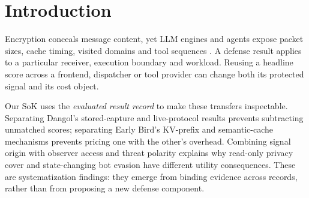\section{Introduction}\label{sec:introduction}
Encryption conceals message content, yet LLM engines and agents expose packet sizes, cache timing, visited domains and tool sequences \cite{weiss2024prompt,promptpeek2025,earlybird2025,agentprint2025,uitraces2026,jeong2026wra}. A defense result applies to a particular receiver, execution boundary and workload. Reusing a headline score across a frontend, dispatcher or tool provider can change both its protected signal and its cost object.

Our SoK uses the \emph{evaluated result record} to make these transfers inspectable. Separating Dangol's stored-capture and live-protocol results prevents subtracting unmatched scores; separating Early Bird's KV-prefix and semantic-cache mechanisms prevents pricing one with the other's overhead. Combining signal origin with observer access and threat polarity explains why read-only privacy cover and state-changing bot evasion have different utility consequences. These are systematization findings: they emerge from binding evidence across records, rather than from proposing a new defense component.

